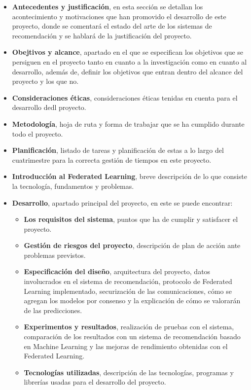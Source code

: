 \begin{itemize}
    \item \textbf{Antecedentes y justificación}, en esta sección se detallan los acontecimiento y motivaciones que han promovido el desarrollo de este proyecto, donde se comentará el estado del arte de los sistemas de recomendación y se hablará de la justificación del proyecto.
    \item \textbf{Obejtivos y alcance}, apartado en el que se especifican los objetivos que se persiguen en el proyecto tanto en cuanto a la investigación como en cuanto al desarrollo, además de, definir los objetivos que entran dentro del alcance del proyecto y los que no.
    \item \textbf{Consideraciones éticas}, consideraciones éticas tenidas en cuenta para el desarrollo dedl proyecto.
    \item \textbf{Metodología}, hoja de ruta y forma de trabajar que se ha cumplido durante todo el proyecto.
    \item \textbf{Planificación}, listado de tareas y planificación de estas a lo largo del cuatrimestre para la correcta gestión de tiempos en este proyecto.
    \item \textbf{Introducción al Federated Learning}, breve descripción de lo que consiste la tecnología, fundamentos y problemas.
    \item \textbf{Desarrollo}, apartado principal del proyecto, en este se puede encontrar: 
        \begin{itemize}
            \item \textbf{Los requisitos del sistema}, puntos que ha de cumplir y satisfacer el proyecto.
            \item \textbf{Gestión de riesgos del proyecto}, descripción de plan de acción ante problemas previstos.
            \item \textbf{Especificación del diseño}, arquitectura del proyecto, datos involucrados en el sistema de recomendación, protocolo de Federated Learning implementado, securización de las comunicaciones, cómo se agregan los modelos por consenso y la explicación de cómo se valorarán de las predicciones.
            \item \textbf{Experimentos y resultados}, realización de pruebas con el sistema, comparación de los resultados con un sistema de recomendación basado en Machine Learning y las mejoras de rendimiento obtenidas con el Federated Learning.
            \item \textbf{Tecnologías utilizadas}, descripción de las tecnologías, programas y librerías usadas para el desarrollo del proyecto.

\end{itemize}
\end{itemize}
